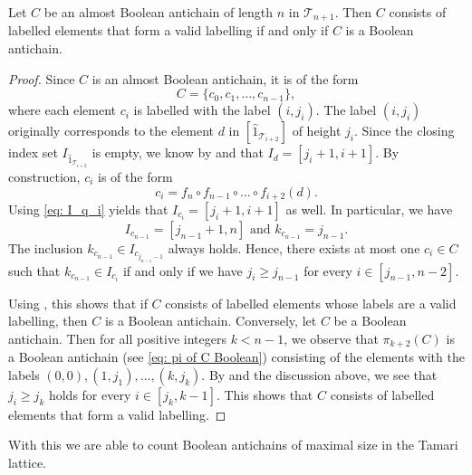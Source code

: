 \documentclass{preprint}
\newcommand{\cT}{\mathcal{T}}
\theoremstyle{definition}
\begin{document}
\begin{lemma}\label{lem: ValidLabellings count BA of max size}
    Let $C$ be an almost Boolean antichain of length $n$ in $\cT_{n+1}$. Then $C$ consists of labelled elements that form a valid labelling if and only if $C$ is a Boolean antichain.
\end{lemma}
\begin{proof}
    Since $C$ is an almost Boolean antichain, it is of the form 
    $$
    C=\{c_0,c_1,\dots,c_{n-1}\},
    $$
    where each element $c_i$ is labelled with the label $(i,j_i)$. The label $(i,j_i)$ originally corresponds to the element $d$ in $[\hat{1}_{\cT_{i+2}}]$ of height $j_i$. Since the closing index set $I_{\hat{1}_{\cT_{i+2}}}$ is empty, we know by  and  that $I_d = [j_i+1, i+1]$. By construction, $c_i$ is of the form
    $$
    c_{i} = f_n \circ f_{n-1} \circ \dots \circ f_{i+2}(d).
    $$
    Using \eqref{eq: I_q_i} yields that $I_{c_i} = [j_i+1, i+1]$ as well. In particular, we have 
    $$
        I_{c_{n-1}} = [j_{n-1}+1, n] \text{ and } k_{c_{n-1}}=j_{n-1}.
    $$
    The inclusion $k_{c_{n-1}} \in I_{c_{j_{n-1}-1}}$ always holds.
    Hence, there exists at most one $c_i \in C$ such that $k_{c_{n-1}} \in I_{c_i}$ if and only if we have $j_i \geq j_{n-1}$ for every $i \in [j_{n-1},n-2]$. 
    
    Using , this shows that if $C$ consists of labelled elements whose labels are a valid labelling, then $C$ is a Boolean antichain.
    Conversely, let $C$ be a Boolean antichain. Then for all positive integers $k < n-1$, we observe that $\pi_{k+2}(C)$ is a Boolean antichain (see \eqref{eq: pi of C Boolean}) consisting of the elements with the labels $(0,0),(1,j_1),\dots,(k,j_k)$. By  and the discussion above, we see that $j_i \geq j_k$ holds for every $i \in [j_k, k-1]$. This shows that $C$ consists of labelled elements that form a valid labelling.
\end{proof}

With this we are able to count Boolean antichains of maximal size in the Tamari lattice.
\end{document}
